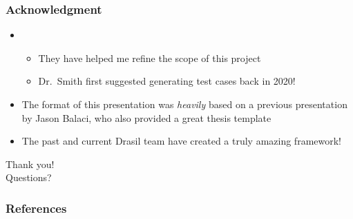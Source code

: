 \documentclass{beamer}
\begin{document}
\begin{frame}
    \frametitle{Acknowledgment}

    \begin{itemize}
        \item \supersAck{}
              \begin{itemize}
                  \item They have helped me refine the scope of this project
                  \item Dr.~Smith first suggested generating test cases back in 2020!
              \end{itemize}
        \item<2-> The format of this presentation was \emph{heavily} based on
              a previous presentation by Jason Balaci, who also provided a
              great thesis template
        \item<3-> The past and current Drasil team have created a truly amazing
              framework!
    \end{itemize}
\end{frame}


\begin{frame}
    \center
    \huge{Thank you!}\\
    \normalsize{Questions?}
\end{frame}



\begin{frame}
    \frametitle{References}

    
\end{frame}
\end{document}
